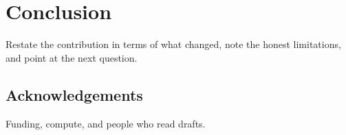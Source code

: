 \section{Conclusion}
\label{sec:conclusion}

Restate the contribution in terms of what changed, note the honest
limitations, and point at the next question.

\subsection*{Acknowledgements}
Funding, compute, and people who read drafts.
